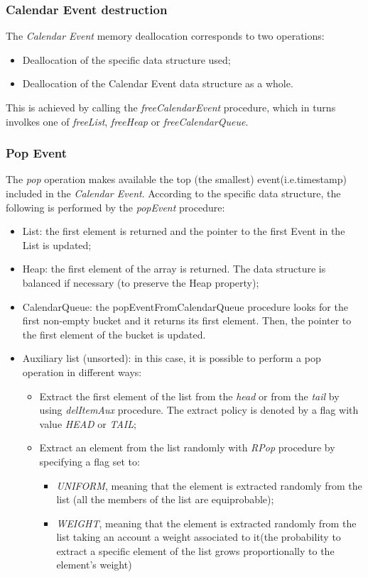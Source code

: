 \subsubsection{Calendar Event destruction}

The \textit{Calendar Event} memory deallocation corresponds to two operations:
\begin{itemize}
\item	Deallocation of the specific data structure used;
\item	Deallocation of the Calendar Event  data structure as a whole.
\end{itemize}

This is achieved by calling the \textit{freeCalendarEvent} procedure, which in turns involkes one of \textit{freeList}, \textit{freeHeap} or \textit{freeCalendarQueue}.

\subsubsection{Pop Event}
	
 The \textit{pop} operation makes available the top (the smallest) event(i.e.timestamp) included in the \textit{Calendar Event}. According to the specific data structure, the following is performed by the \textit{popEvent} procedure:
 \begin{itemize}
\item	List: the first element is returned and the pointer to the first Event in the List is updated;
\item	Heap: the first element of the array is returned. The data structure is balanced if necessary (to preserve the Heap property);
\item	CalendarQueue: the popEventFromCalendarQueue procedure looks for the first non-empty bucket and it returns its first element. Then, the pointer to the first element of the bucket is updated.
\item    Auxiliary list (unsorted): in this case, it is possible to perform a pop operation in different ways: 
  \begin{itemize}
	\item Extract the first element of the list from the \textit{head} or from the \textit{tail} by using \textit{delItemAux} procedure. The extract policy is denoted by a flag with value \textit{HEAD} or \textit{TAIL};
	\item Extract an element from the list randomly with \textit{RPop} procedure by specifying a flag set to:
		\begin{itemize}
			\item \textit{UNIFORM}, meaning that the element is extracted randomly from the list (all the members of the list are equiprobable);
			\item \textit{WEIGHT}, meaning that the element is extracted randomly from the list taking an account a weight associated to it(the probability to extract a specific element of the list grows proportionally to the element's weight)
		\end{itemize}
  \end{itemize}

\end{itemize}


